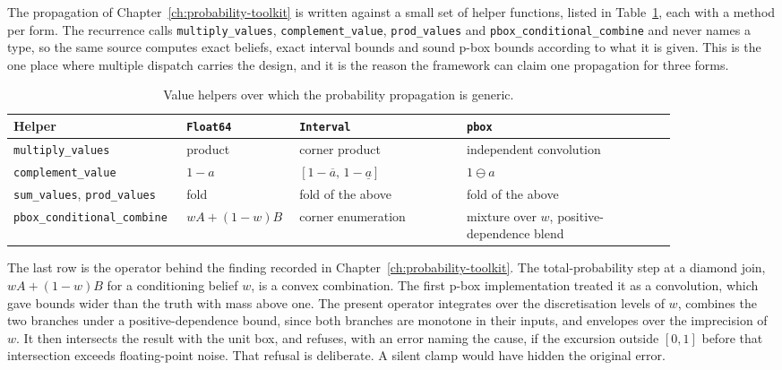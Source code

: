 \documentclass[12pt]{report}
\begin{document}
The propagation of Chapter~\ref{ch:probability-toolkit} is written
against a small set of helper functions, listed in Table~\ref{tab:pkg-helpers}, each with a
method per form. The recurrence calls \texttt{multiply\_values}, \texttt{complement\_value},
\texttt{prod\_values} and \texttt{pbox\_conditional\_combine} and never names a type, so
the same source computes exact beliefs, exact interval bounds and sound p-box bounds
according to what it is given. This is the one place where multiple dispatch carries the
design, and it is the reason the framework can claim one propagation for three forms.

\begin{table}[htbp]
\centering
\caption{Value helpers over which the probability propagation is generic.}
\label{tab:pkg-helpers}
\small
\renewcommand{\arraystretch}{1.3}
\begin{tabular}{@{}p{0.19\linewidth}p{0.13\linewidth}p{0.24\linewidth}p{0.30\linewidth}@{}}
\toprule
Helper & \texttt{Float64} & \texttt{Interval} & \texttt{pbox} \\
\midrule
\texttt{multiply\_\allowbreak values} & product & corner product & independent convolution \\
\texttt{complement\_\allowbreak value} & $1-a$ & $[1-\overline{a},\,1-\underline{a}]$ & $1 \ominus a$ \\
\texttt{sum\_\allowbreak values}, \texttt{prod\_\allowbreak values} & fold & fold of the above & fold of the above \\
\texttt{pbox\_\allowbreak conditional\_\allowbreak combine} & $wA+(1-w)B$ & corner enumeration & mixture over $w$, positive-dependence blend \\
\bottomrule
\end{tabular}
\end{table}

The last row is the operator behind the finding recorded in
Chapter~\ref{ch:probability-toolkit}. The total-probability step at a diamond join,
$wA + (1-w)B$ for a conditioning belief $w$, is a convex combination. The first p-box
implementation treated it as a
convolution, which gave bounds wider than the truth with
mass above one. The present operator integrates over the discretisation levels of $w$,
combines the two branches under a positive-dependence bound, since both branches are
monotone in their inputs, and envelopes over the imprecision of $w$. It then intersects
the result with the unit box, and refuses, with an error naming the cause, if the excursion outside
$[0,1]$ before that intersection exceeds floating-point noise. That refusal is deliberate.
A silent clamp would have hidden the original error.
\end{document}
